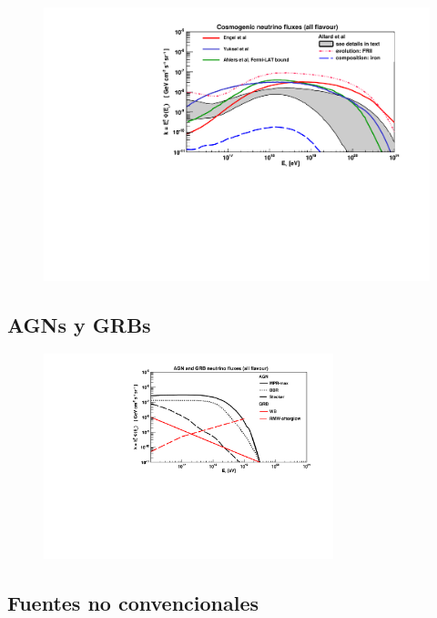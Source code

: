 	\begin{figure}[ht]
		\begin{center}
		\includegraphics[width=\textwidth]{fig/introduccion/gzk_fluxes}
		\caption{\label{fig:flujosGZK} }
		\end{center}
	\end{figure}
	
	\subsection{AGNs y GRBs}
	
	\begin{figure}[ht]
		\begin{center}
		\includegraphics[width=0.75\textwidth]{fig/introduccion/AGN_GRB_nufluxes}
		\caption{\label{fig:flujosAGN} }
		\end{center}
	\end{figure}
	
	\subsection{Fuentes no convencionales}
	
